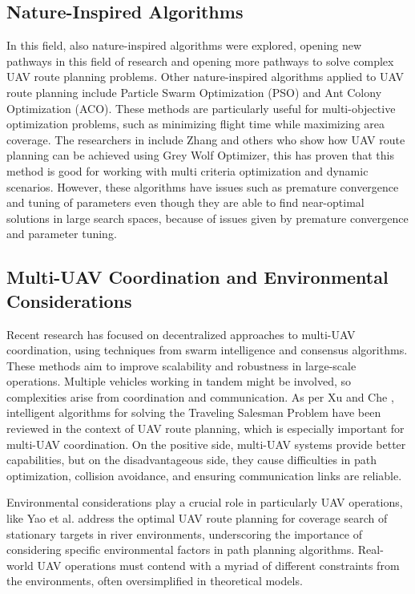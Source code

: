 \documentclass[conference]{IEEEtran}
\begin{document}
\subsection{Nature-Inspired Algorithms}

In this field, also nature-inspired algorithms were explored, opening new pathways in this field of research and opening more pathways to solve complex UAV route planning problems. Other nature-inspired algorithms applied to UAV route planning include Particle Swarm Optimization (PSO) and Ant Colony Optimization (ACO). These methods are particularly useful for multi-objective optimization problems, such as minimizing flight time while maximizing area coverage. The researchers in \cite{paper4} include Zhang and others who show how UAV route planning can be achieved using Grey Wolf Optimizer, this has proven that this method is good for working with multi criteria optimization and dynamic scenarios. However, these algorithms have issues such as premature convergence and tuning of parameters even though they are able to find near-optimal solutions in large search spaces, because of issues given by premature convergence and parameter tuning.

\subsection{Multi-UAV Coordination and Environmental Considerations}

Recent research has focused on decentralized approaches to multi-UAV coordination, using techniques from swarm intelligence and consensus algorithms. These methods aim to improve scalability and robustness in large-scale operations. Multiple vehicles working in tandem might be involved, so complexities arise from coordination and communication. As per Xu and Che \cite{paper2}, intelligent algorithms for solving the Traveling Salesman Problem have been reviewed in the context of UAV route planning, which is especially important for multi-UAV coordination. On the positive side, multi-UAV systems provide better capabilities, but on the disadvantageous side, they cause difficulties in path optimization, collision avoidance, and ensuring communication links are reliable. 

Environmental considerations play a crucial role in particularly UAV operations, like Yao et al. \cite{paper5} address the optimal UAV route planning for coverage search of stationary targets in river environments, underscoring the importance of considering specific environmental factors in path planning algorithms. Real-world UAV operations must contend with a myriad of different constraints from the environments, often oversimplified in theoretical models.
\end{document}
